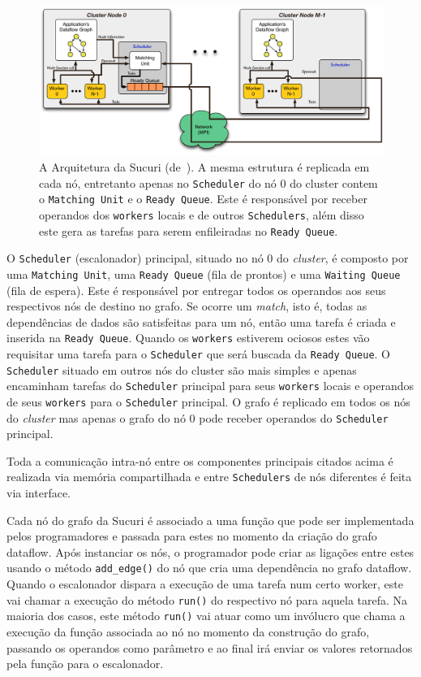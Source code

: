 \begin{figure}[htbp]
    \centering
    \includegraphics[scale=0.65]{figuras/dataflow/SucuriArchitectureHorizonal.png}
    \caption{A Arquitetura da Sucuri (de~\cite{sucuri-original}).
    A mesma estrutura é replicada em cada nó, entretanto apenas no \texttt{Scheduler} do nó 0 do cluster contem o \texttt{Matching Unit} e o \texttt{Ready Queue}.
    Este é responsável por receber operandos dos \texttt{workers} locais e de outros \texttt{Schedulers}, além disso este gera as tarefas para serem enfileiradas no \texttt{Ready Queue}.}
    \label{fig:arch}
\end{figure}

O \texttt{Scheduler} (escalonador) principal, situado no nó 0 do \emph{cluster}, é composto por uma \texttt{Matching Unit}, uma \texttt{Ready Queue} (fila de prontos) e uma \texttt{Waiting Queue} (fila de espera).
Este é responsável por entregar todos os operandos aos seus respectivos nós de destino no grafo.
Se ocorre um \emph{match}, isto é, todas as dependências de dados são satisfeitas para um nó, então uma tarefa é criada e inserida na \texttt{Ready Queue}.
Quando os \texttt{workers} estiverem ociosos estes vão requisitar uma tarefa para o \texttt{Scheduler} que será buscada da \texttt{Ready Queue}.
O \texttt{Scheduler} situado em outros nós do cluster são mais simples e apenas encaminham tarefas do \texttt{Scheduler} principal para seus \texttt{workers} locais e operandos de seus \texttt{workers} para o \texttt{Scheduler} principal.
O grafo é replicado em todos os nós do \emph{cluster} mas apenas o grafo do nó 0 pode receber operandos do \texttt{Scheduler} principal.

Toda a comunicação intra-nó entre os componentes principais citados acima é realizada via memória compartilhada e entre \texttt{Schedulers} de nós diferentes é feita via interface.

Cada nó do grafo da Sucuri é associado a uma função que pode ser implementada pelos programadores e passada para estes no momento da criação do grafo dataflow.
Após instanciar os nós, o programador pode criar as ligações entre estes usando o método \texttt{add\_edge()} do nó que cria uma dependência no grafo dataflow.
Quando o escalonador dispara a execução de uma tarefa num certo worker, este vai chamar a execução do método \texttt{run()} do respectivo nó para aquela tarefa.
Na maioria dos casos, este método \texttt{run()} vai atuar como um invólucro que chama a execução da função associada ao nó no momento da construção do grafo, passando os operandos como parâmetro e ao final irá enviar os valores retornados pela função para o escalonador.


